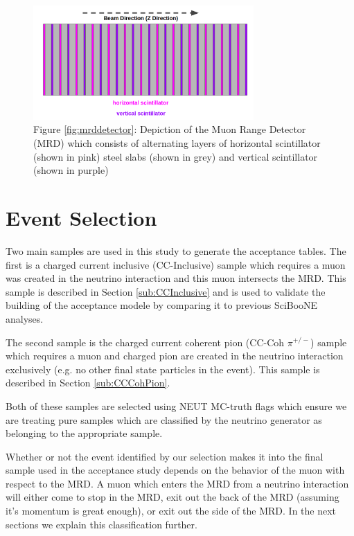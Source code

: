 \documentclass[11pt]{article}
\begin{document}
\begin{figure}[H]
\centering
\includegraphics[width=0.75\textwidth]{EventClassifications/mrd.png}
\caption*{Figure \ref*{fig:mrddetector}: Depiction of the Muon Range Detector (MRD) which consists of alternating layers of horizontal scintillator (shown in pink) steel slabs (shown in grey) and vertical scintillator (shown in purple)}
\end{figure}\label{fig:mrddetector}



\section{Event Selection}\label{sec:eventselection}
Two main samples are used in this study to generate the acceptance tables. The first is a charged current inclusive (CC-Inclusive) sample which requires a muon was created in the neutrino interaction and this muon intersects the MRD. This sample is described in Section \ref*{sub:CCInclusive} and is used to validate the building of the acceptance modele by comparing it to previous SciBooNE analyses.

The second sample is the charged current coherent pion (CC-Coh $\pi^{+/-}$) sample which requires a muon and charged pion are created in the neutrino interaction exclusively (e.g. no other final state particles in the event). This sample is described in Section \ref*{sub:CCCohPion}.

Both of these samples are selected using NEUT MC-truth flags which ensure we are treating pure samples which are classified by the neutrino generator as belonging to the appropriate sample.

Whether or not the event identified by our selection makes it into the final sample used in the acceptance study depends on the behavior of the muon with respect to the MRD. A muon which enters the MRD from a neutrino interaction will either come to stop in the MRD, exit out the back of the MRD (assuming it's momentum is great enough), or exit out the side of the MRD. In the next sections we explain this classification further.
\end{document}
